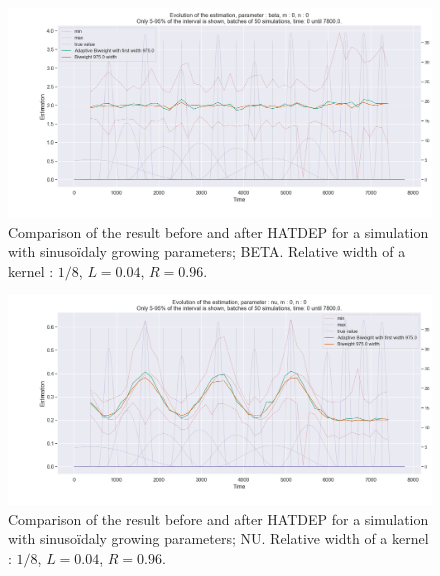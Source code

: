 \begin{figure}
\centering
\includegraphics[width = 0.90 \textwidth]{../imag/chap3/4_bis/Q.png}
\caption{Comparison of the result before and after HATDEP for a simulation with sinusoïdaly growing parameters; BETA. Relative width of a kernel : $1/8$, $L = 0.04$, $R = 0.96$.}
\label{fig:second_estimate_4_beta}
\end{figure}

\begin{figure}
\centering
\includegraphics[width = 0.90 \textwidth]{../imag/chap3/4_bis/R.png}
\caption{Comparison of the result before and after HATDEP for a simulation with sinusoïdaly growing parameters; NU. Relative width of a kernel : $1/8$, $L = 0.04$, $R = 0.96$.}
\label{fig:second_estimate_4_nu}
\end{figure}









